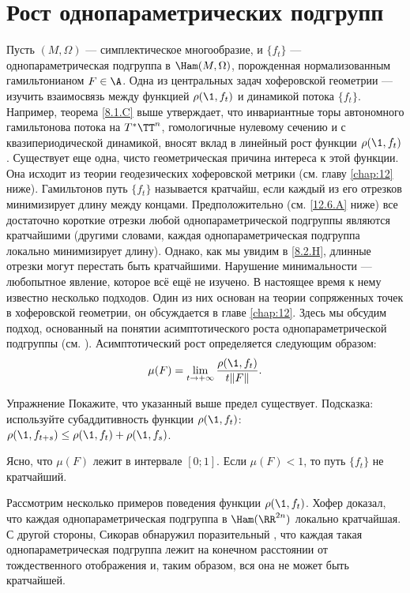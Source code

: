 \section{Рост однопараметрических подгрупп}
Пусть $(M, \Omega)$ --- симплектическое многообразие, и $\{f_t\}$ ---
однопараметрическая подгруппа в $\Ham (M, \Omega)$, порожденная
нормализованным гамильтонианом $F \in \A$. 
Одна из центральных задач хоферовской геометрии --- изучить
взаимосвязь между функцией $\rho (\1, f_t)$ и динамикой потока
$\{f_t\}$.
Например, теорема \ref{8.1.C} выше утверждает, что инвариантные торы
автономного гамильтонова потока на $T^\ast \TT^n$,  гомологичные
нулевому сечению и с квазипериодической динамикой, вносят вклад в
линейный рост функции $\rho (\1, f_t)$. 
Существует еще одна, чисто геометрическая причина интереса к этой функции.
Она исходит из теории геодезических хоферовской метрики (см. главу
\ref{chap:12} ниже). 
Гамильтонов путь $\{f_t\}$ называется кратчайш, если
каждый из его отрезков минимизирует длину между  концами. 
Предположительно (см. \ref{12.6.A} ниже) все достаточно короткие
отрезки любой однопараметрической подгруппы являются кратчайшими
(другими словами, каждая однопараметрическая подгруппа локально
минимизирует длину). 
Однако, как мы увидим в \ref{8.2.H}, длинные отрезки могут перестать
быть кратчайшими. 
Нарушение минимальности --- любопытное явление, которое всё ещё не изучено.
В настоящее время к нему известно несколько подходов.
Один из них основан на теории сопряженных точек в хоферовской
геометрии, он обсуждается в главе \ref{chap:12}. 
Здесь мы обсудим подход, основанный на понятии асимптотического роста
однопараметрической подгруппы (см. \cite{BP2}). 
Асимптотический рост определяется следующим образом:
\[\mu(F)=\lim_{t \to + \infty}\frac{\rho (\1, f_t)}{ t \| F \|}.\]

\begin{thm*}{Упражнение}
  Покажите, что указанный выше предел существует.
  Подсказка: используйте субаддитивность функции $\rho (\1, f_t)$:
  $\rho (\1, f_{t + s}) \le \rho (\1, f_t) + \rho (\1, f_s)$. 
\end{thm*}

Ясно, что $\mu (F)$ лежит в интервале $[0; 1]$.
Если $\mu (F) <1$, то путь $\{f_t\}$ не кратчайший.

Рассмотрим несколько примеров поведения функции $\rho (\1, f_t)$.
Хофер \cite{H2} доказал, что каждая однопараметрическая подгруппа в $\Ham (\RR^{2n})$ локально кратчайшая.
С другой стороны, Сикорав \cite{S2} обнаружил поразительный , что каждая такая однопараметрическая подгруппа лежит на конечном расстоянии от тождественного отображения и, таким образом, вся она не может быть кратчайшей.

